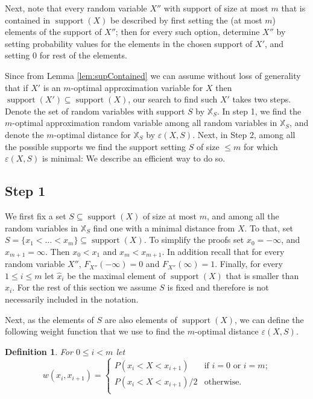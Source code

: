 \documentclass{article}
\newtheorem{definition}[thm]{Definition}
\DeclareMathOperator{\support}{support}
\begin{document}
Next, note that every random variable $X''$ with support of size at most $m$ that is contained in $\support(X)$ be described by first setting the (at most $m$) elements of the support of $X''$; then for every such option, determine $X''$ by setting probability values for the elements in the chosen support of $X'$, and setting $0$ for rest of the elements.

Since from Lemma \ref{lem:supContained} we can assume without loss of generality that if  $X'$ is an $m$-optimal approximation variable for $X$ then $\support(X') \subseteq \support(X)$, our search to find such $X'$ takes two steps. Denote the set of random variables with support $S$ by $\mathbb{X}_S$. In step 1, we find the $m$-optimal approximation random variable among all random variables in $\mathbb{X}_S$, and denote the $m$-optimal distance for $\mathbb{X}_S$ by $\varepsilon(X,S)$. Next, in Step 2, among all the possible supports we find the support setting $S$ of size $\leq m$ for which $\varepsilon(X,S)$ is minimal: We describe an efficient way to do so.

\subsection{Step 1}


We first fix a set $S\subseteq \support(X)$ of size at most $m$, and among all the random variables in $\mathbb{X}_S$ find one with a minimal distance from $X$. To that, set $S=\{x_1<\dots<x_m\} \subseteq \support(X)$. To simplify the proofs set $x_0=-\infty$, and $x_{m+1}=\infty$. Then $x_0<x_1$ and $x_m<x_{m+1}$. In addition recall that for every random variable $X''$, $F_{X''}(-\infty) = 0$ and $F_{X''}(\infty)=1$. Finally, for every $1\leq i \leq m$ let $\hat x_i$ be the maximal element of $\support(X)$ that is smaller than $x_i$.
For the rest of this section we assume $S$ is fixed and therefore is not necessarily included in the notation.

Next, as the elements of $S$ are also elements of $\support(X)$, we can define the following weight function that we use to find the $m$-optimal distance $\varepsilon(X,S)$. 

\begin{definition}\label{def:weight} For $0\leq i < m$ let
	\[
	w(x_i,x_{i+1})=
	\begin{cases}
	P(x_i < X < x_{i+1}) & \text{if $i=0$ or $i = m$;} \\
	P(x_i < X < x_{i+1})/2 & \text{otherwise.} \\	
	\end{cases}
	\]
\end{definition}
\end{document}
